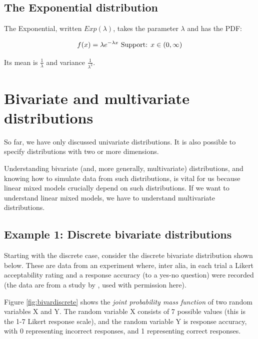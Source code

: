 \documentclass[12pt,]{krantz}
\begin{document}
\hypertarget{the-exponential-distribution}{%
\subsection{The Exponential distribution}\label{the-exponential-distribution}}

The Exponential, written \(Exp(\lambda)\), takes the parameter \(\lambda\) and has the PDF:

\begin{equation}
f(x) = \lambda e^{-\lambda x} \hbox{  Support: } x \in (0, \infty)
\end{equation}

Its mean is \(\frac{1}{\lambda}\) and variance \(\frac{1}{\lambda^2}\).

\hypertarget{bivariate-and-multivariate-distributions}{%
\section{Bivariate and multivariate distributions}\label{bivariate-and-multivariate-distributions}}

So far, we have only discussed univariate distributions. It is also possible to specify distributions with two or more dimensions.

Understanding bivariate (and, more generally, multivariate) distributions, and knowing how to simulate data from such distributions, is vital for us because linear mixed models crucially depend on such distributions. If we want to understand linear mixed models, we have to understand multivariate distributions.

\hypertarget{example-1-discrete-bivariate-distributions}{%
\subsection{Example 1: Discrete bivariate distributions}\label{example-1-discrete-bivariate-distributions}}

Starting with the discrete case, consider the discrete bivariate distribution shown below. These are data from an experiment where, inter alia, in each trial a Likert acceptability rating and a response accuracy (to a yes-no question) were recorded (the data are from a study by \citet{AnnaLphd}, used with permission here).

Figure \ref{fig:bivardiscrete} shows the \emph{joint probability mass function} of two random variables X and Y. The random variable X consists of 7 possible values (this is the 1-7 Likert response scale), and the random variable Y is response accuracy, with 0 representing incorrect responses, and 1 representing correct responses.
\end{document}
